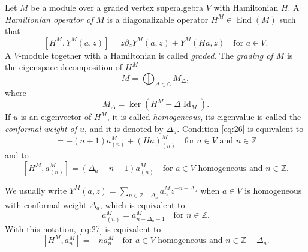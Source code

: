 \documentclass[a4paper, 12pt, reqno]{amsart}
\theoremstyle{remark}
\DeclareMathOperator{\Id}{Id}
\DeclareMathOperator{\End}{End}
\begin{document}
Let $M$ be a module over a graded vertex superalgebra $V$ with Hamiltonian $H$.
A \emph{Hamiltonian operator of $M$} is a diagonalizable operator $H^M \in \End(M)$ such that
\begin{equation}
  \label{eq:26}
  [H^M, Y^M(a, z)] = z\partial_zY^M(a, z) + Y^M(Ha, z) \quad \text{for $a \in V$}.
\end{equation}
A $V$-module together with a Hamiltonian is called \emph{graded}.
The \emph{grading of $M$} is the eigenspace decomposition of $H^M$
\begin{equation*}
  M = \bigoplus_{\Delta \in \mathbb{C}}M_{\Delta},
\end{equation*}
where
\begin{equation*}
  M_{\Delta} = \ker(H^M - \Delta\Id_M).
\end{equation*}
If $u$ is an eigenvector of $H^M$, it is called \emph{homogeneous}, its eigenvalue is called the \emph{conformal weight of $u$}, and it is denoted by $\Delta_u$.
Condition \eqref{eq:26} is equivalent to
\begin{equation*}
  [H^M, a^M_{(n)}] = -(n + 1)a^M_{(n)} + (Ha)^M_{(n)} \quad \text{for $a \in V$ and $n \in \mathbb{Z}$}
\end{equation*}
and to
\begin{equation}
  \label{eq:27}
  [H^M, a^M_{(n)}] = (\Delta_a - n - 1)a^M_{(n)} \quad \text{for $a \in V$ homogeneous and $n \in \mathbb{Z}$}.
\end{equation}

We usually write $Y^M(a, z) = \sum_{n \in \mathbb{Z} - \Delta_a}a^M_nz^{-n - \Delta_a}$ when $a \in V$ is homogeneous with conformal weight $\Delta_a$, which is equivalent to
\begin{equation*}
  a^M_{(n)} = a^M_{n - \Delta_a + 1} \quad \text{for $n \in \mathbb{Z}$}.
\end{equation*}
With this notation, \eqref{eq:27} is equivalent to
\begin{equation}
  \label{eq:28}
  [H^M, a^M_n] = -na^M_n \quad \text{for $a \in V$ homogeneous and $n \in \mathbb{Z} - \Delta_a$}.
\end{equation}
\end{document}
